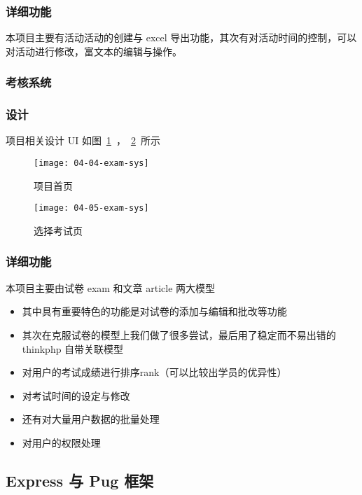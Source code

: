 \subsubsection*{详细功能}

本项目主要有活动活动的创建与 excel 导出功能，其次有对活动时间的控制，可以对活动进行修改，富文本的编辑与操作。

\subsubsection{考核系统}
\label{sec:requirements}

\subsubsection*{设计}

项目相关设计 UI 如图~\ref{fig:04-04-exam-sys}~，~\ref{fig:04-05-exam-sys}~所示

\begin{figure}[htbp]
\centering
\texttt{[image: 04-04-exam-sys]}
\caption{项目首页}
\label{fig:04-04-exam-sys}
\end{figure}

\begin{figure}[htbp]
\centering
\texttt{[image: 04-05-exam-sys]}
\caption{选择考试页}
\label{fig:04-05-exam-sys}
\end{figure}

\subsubsection*{详细功能}

本项目主要由试卷 exam 和文章 article 两大模型
\begin{itemize}
  \item 其中具有重要特色的功能是对试卷的添加与编辑和批改等功能
  \item 其次在克服试卷的模型上我们做了很多尝试，最后用了稳定而不易出错的 thinkphp 自带关联模型
  \item 对用户的考试成绩进行排序rank（可以比较出学员的优异性）
  \item 对考试时间的设定与修改
  \item 还有对大量用户数据的批量处理
  \item 对用户的权限处理
\end{itemize}

\subsection{Express 与 Pug 框架}


